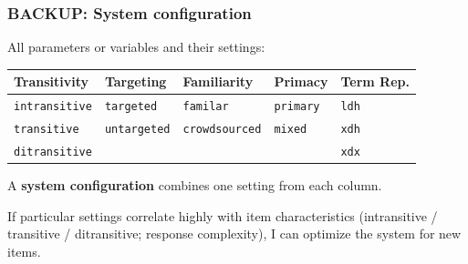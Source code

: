 \documentclass[handout,xcolor={dvipsnames}]{beamer}
\newcommand{\param}[1]{\texttt{#1}}
\begin{document}
\begin{frame}
\frametitle{BACKUP: System configuration}
\small

\vspace{-.5em}
\pause
All parameters or variables and their settings:

\vspace{-.7em}
\begin{table}
\begin{center}
\begin{tabular}{|l|l|l|l|l|}
\hline
\textbf{Trans\-i\-ti\-vi\-ty} & \textbf{Tar\-get\-ing} & \textbf{Fam\-il\-iar\-i\-ty} & \textbf{Prim\-a\-cy} & \textbf{Term Rep.} \\
\hline
\hline
\param{in\-trans\-i\-tive} & \param{tar\-get\-ed} & \param{familar} & \param{prim\-a\-ry} & \param{ldh} \\
\hline
\param{trans\-i\-tive} & \param{un\-tar\-get\-ed} & \param{crowd\-sourced} & \param{mix\-ed} & \param{xdh} \\
\hline
\param{di\-trans\-i\-tive} & & & & \param{xdx} \\
\hline
\end{tabular}
\label{tab:all-params}
\end{center}
\end{table}

\vspace{1.2em}
A \textbf{system configuration} combines one setting from each column.

\vspace{1.2em}
If particular settings correlate highly with item characteristics (intransitive / transitive / ditransitive; response complexity), I can optimize the system for new items.

\end{frame}



%
%
\end{document}
